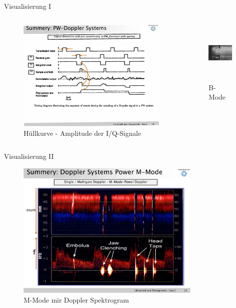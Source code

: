 \documentclass{beamer}
\begin{document}
\begin{frame}{Visualisierung I}
\begin{columns}
		\begin{figure}[t]
			\includegraphics[page=3,trim = 80mm 88mm 38mm 52mm, clip=true, width=\textwidth]{Ultrasound/pw_rx}
			\caption{Hüllkurve - Amplitude der I/Q-Signale}
		\end{figure}
	\centering
		\begin{figure}[t]
			\includegraphics[trim = 80mm 0mm 0mm 0mm, clip=true, height=3cm,]{Ultrasound/b-Mode}
			\caption{B-Mode}
		\end{figure}
	\end{columns}
\end{frame}

\begin{frame}{Visualisierung II}
\begin{figure}[t]
			  \includegraphics[trim = 0.3cm 14mm 1.3cm 3.5cm, clip=true, width=0.8\textwidth]{M-Mode} 
			\caption{M-Mode mir Doppler Spektrogram}
		\end{figure}
\end{frame}
%
%
%
%
\end{document}
